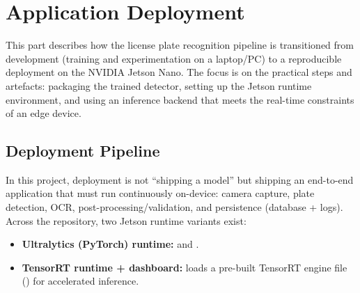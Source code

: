 %
%
%

\chapter{Application Deployment}
\label{ch:application_deployment}

\noindent
This part describes how the license plate recognition pipeline is transitioned from development (training and experimentation on a laptop/PC) to a reproducible deployment on the NVIDIA Jetson Nano.
The focus is on the practical steps and artefacts: packaging the trained detector, setting up the Jetson runtime environment, and using an inference backend that meets the real-time constraints of an edge device.

\section{Deployment Pipeline}
\label{sec:deployment_pipeline}

\noindent
In this project, deployment is not ``shipping a model'' but shipping an end-to-end application that must run continuously on-device: camera capture, plate detection, OCR, post-processing/validation, and persistence (database + logs).
Across the repository, two Jetson runtime variants exist:
\begin{itemize}
	\item \textbf{Ultralytics (PyTorch) runtime:}  and .
	\item \textbf{TensorRT runtime + dashboard:}  loads a pre-built TensorRT engine file () for accelerated inference.
\end{itemize}

